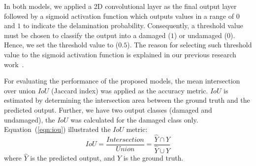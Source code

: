 In both models, we applied a 2D convolutional layer as the final output layer followed by a sigmoid activation function which outputs values in a range of \(0\) and \(1\) to indicate the delamination probability.
Consequently, a threshold value must be chosen to classify the output into a damaged (\(1\)) or undamaged (\(0\)).
Hence, we set the threshold value to (\(0.5\)).
The reason for selecting such threshold value to the sigmoid activation function is explained in our previous research work~\cite{Ijjeh2021}.

For evaluating the performance of the proposed models, the mean 
intersection over union \(IoU\) (Jaccard index) was applied as the accuracy metric. 
\(IoU\) is estimated by determining the intersection
area between the ground truth and the predicted output. 
Further, we have two output classes (damaged and undamaged), the \(IoU\) was calculated for the damaged class only. 
Equation~(\ref{eqn:iou}) illustrated the \(IoU\) metric: 
\begin{equation}
IoU=\frac{Intersection}{Union}=\frac{\hat{Y} \cap Y}{\hat{Y} \cup Y}
\label{eqn:iou}
\end{equation}
where \(\hat{Y}\) is the predicted output, and \(Y\) is the ground truth.
